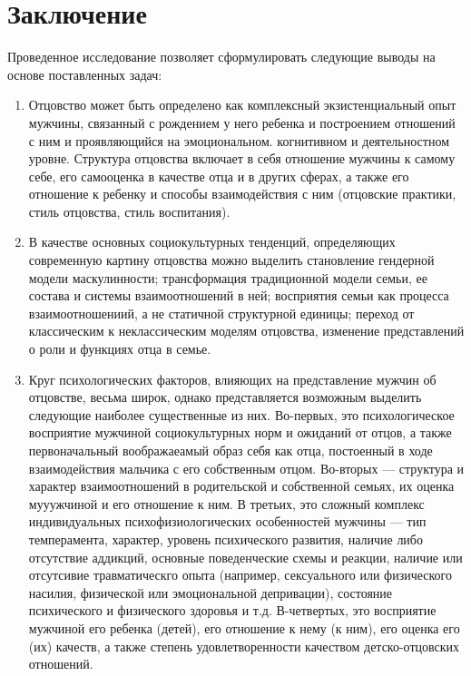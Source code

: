 \documentclass{../../common/thesisbyxetex}
\begin{document}
\chapter*{Заключение}

Проведенное исследование позволяет сформулировать следующие выводы на основе поставленных задач:

\begin{enumerate}
 \item Отцовство может быть определено как комплексный экзистенциальный опыт мужчины,
связанный с рождением у него ребенка и построением отношений с ним и проявляющийся на 
эмоциональном.
когнитивном и деятельностном уровне. 
Структура отцовства включает в себя отношение мужчины к самому 
себе, его самооценка в качестве отца и в других сферах, а также его отношение к ребенку и способы 
взаимодействия с ним (отцовские практики, стиль отцовства, стиль воспитания). 

\item В качестве основных социокультурных тенденций, определяющих современную картину отцовства 
можно выделить становление гендерной модели маскулинности; трансформация традиционной модели семьи, 
ее состава и системы взаимоотношений в ней; восприятия семьи как процесса взаимоотношениий, а не 
статичной структурной единицы; переход от классическим к неклассическим моделям отцовства, 
изменение представлений о роли и функциях отца в семье.

\item  Круг психологических факторов, влияющих на представление мужчин об отцовстве, весьма широк, 
однако
представляется
возможным выделить следующие наиболее существенные из них. Во-первых, это психологическое 
восприятие мужчиной  социокультурных норм и ожиданий от отцов, а также первоначальный воображаеамый 
образ себя как отца, постоенный в ходе взаимодействия мальчика с его собственным отцом. Во-вторых 
--- структура и характер взаимоотношений в родительской и собственной семьях, их оценка мууужчиной 
и его отношение к ним. В третьих, это сложный комплекс индивидуальных 
психофизиологических особенностей мужчины --- тип темперамента, характер, уровень психического 
развития, наличие либо отсутствие аддикций, основные поведенческие схемы и реакции, наличие или 
отсутсивие травматическго опыта (например, сексуального или физического насилия, физической или 
эмоциональной депривации), состояние психического и физического здоровья и т.д. В-четвертых, это 
восприятие мужчиной его  ребенка (детей), его отношение к нему (к ним), его оценка его (их) 
качеств, а также степень удовлетворенности качеством детско-отцовских отношений.

\end{enumerate}




\printbibliography[heading=bibintoc,env=gostbibliography,sorting=ntvy]
\end{document}

